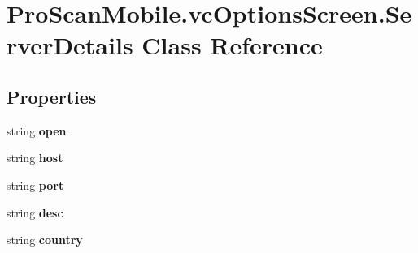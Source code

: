 \hypertarget{class_pro_scan_mobile_1_1vc_options_screen_1_1_server_details}{\section{Pro\-Scan\-Mobile.\-vc\-Options\-Screen.\-Server\-Details Class Reference}
\label{class_pro_scan_mobile_1_1vc_options_screen_1_1_server_details}
}
\subsection*{Properties}
\begin{DoxyCompactItemize}
\item 
\hypertarget{class_pro_scan_mobile_1_1vc_options_screen_1_1_server_details_ae2b39ca21c9050a6a96bb15c7ddfdf79}{string {\bfseries open}}\label{class_pro_scan_mobile_1_1vc_options_screen_1_1_server_details_ae2b39ca21c9050a6a96bb15c7ddfdf79}

\item 
\hypertarget{class_pro_scan_mobile_1_1vc_options_screen_1_1_server_details_a762d9eae22a69429c6881f8b7710fb67}{string {\bfseries host}}\label{class_pro_scan_mobile_1_1vc_options_screen_1_1_server_details_a762d9eae22a69429c6881f8b7710fb67}

\item 
\hypertarget{class_pro_scan_mobile_1_1vc_options_screen_1_1_server_details_a657f20b977f68b9a6324f1da080b5ef9}{string {\bfseries port}}\label{class_pro_scan_mobile_1_1vc_options_screen_1_1_server_details_a657f20b977f68b9a6324f1da080b5ef9}

\item 
\hypertarget{class_pro_scan_mobile_1_1vc_options_screen_1_1_server_details_a384687ca8c0040814629776ea291f6fc}{string {\bfseries desc}}\label{class_pro_scan_mobile_1_1vc_options_screen_1_1_server_details_a384687ca8c0040814629776ea291f6fc}

\item 
\hypertarget{class_pro_scan_mobile_1_1vc_options_screen_1_1_server_details_aa916419a83933de397736bdfc12a9fb6}{string {\bfseries country}}\label{class_pro_scan_mobile_1_1vc_options_screen_1_1_server_details_aa916419a83933de397736bdfc12a9fb6}


\end{DoxyCompactItemize}
